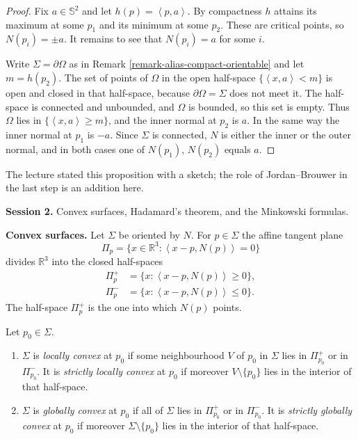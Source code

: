\begin{proof}
Fix $a\in\mathbb{S}^2$ and let
$h(p)=\left\langle{} p,a\right\rangle{}$.
By compactness $h$ attains its maximum at
some $p_1$ and its minimum at some $p_2$.
These are critical points, so
$N(p_i)=\pm a$. It remains to see that
$N(p_i)=a$ for some $i$.

Write $\Sigma=\partial\Omega$ as in Remark
\ref{remark-alias-compact-orientable} and
let $m=h(p_2)$. The set of points of
$\Omega$ in the open half-space
$\{\left\langle{} x,a\right\rangle{}<m\}$
is open and closed in that half-space,
because $\partial\Omega=\Sigma$ does not
meet it. The half-space is connected and
unbounded, and $\Omega$ is bounded, so
this set is empty. Thus $\Omega$ lies in
$\{\left\langle{} x,a\right\rangle{}\geq
m\}$, and the inner normal at $p_2$ is
$a$. In the same way the inner normal at
$p_1$ is $-a$. Since $\Sigma$ is
connected, $N$ is either the inner or the
outer normal, and in both cases one of
$N(p_1)$, $N(p_2)$ equals $a$.
\end{proof}

The lecture stated this proposition with
a sketch; the role of Jordan--Brouwer in
the last step is an addition here.

\medskip\noindent
{\bf Session 2.}
Convex surfaces, Hadamard's theorem, and
the Minkowski formulas.

\medskip\noindent
{\bf Convex surfaces.}
Let $\Sigma$ be oriented by $N$. For
$p\in\Sigma$ the affine tangent plane
$$
\Pi_p=\{x\in\mathbb{R}^3:
\left\langle{} x-p,N(p)\right\rangle{}=0\}
$$
divides $\mathbb{R}^3$ into the closed
half-spaces
$$
\begin{aligned}
\Pi_p^+&=\{x:\left\langle{} x-p,N(p)
\right\rangle{}\geq 0\},\\
\Pi_p^-&=\{x:\left\langle{} x-p,N(p)
\right\rangle{}\leq 0\}.
\end{aligned}
$$
The half-space $\Pi_p^+$ is the one
into which $N(p)$ points.

\begin{definition}
\label{definition-alias-convexity}
Let $p_0\in\Sigma$.
\begin{enumerate}
\item $\Sigma$ is \emph{locally convex} at
$p_0$ if some neighbourhood $V$ of $p_0$
in $\Sigma$ lies in $\Pi_{p_0}^+$ or in
$\Pi_{p_0}^-$. It is \emph{strictly
locally convex} at $p_0$ if moreover
$V\setminus\{p_0\}$ lies in the interior
of that half-space.
\item $\Sigma$ is \emph{globally convex}
at $p_0$ if all of $\Sigma$ lies in
$\Pi_{p_0}^+$ or in $\Pi_{p_0}^-$. It is
\emph{strictly globally convex} at $p_0$
if moreover $\Sigma\setminus\{p_0\}$ lies
in the interior of that half-space.
\end{enumerate}
\end{definition}

